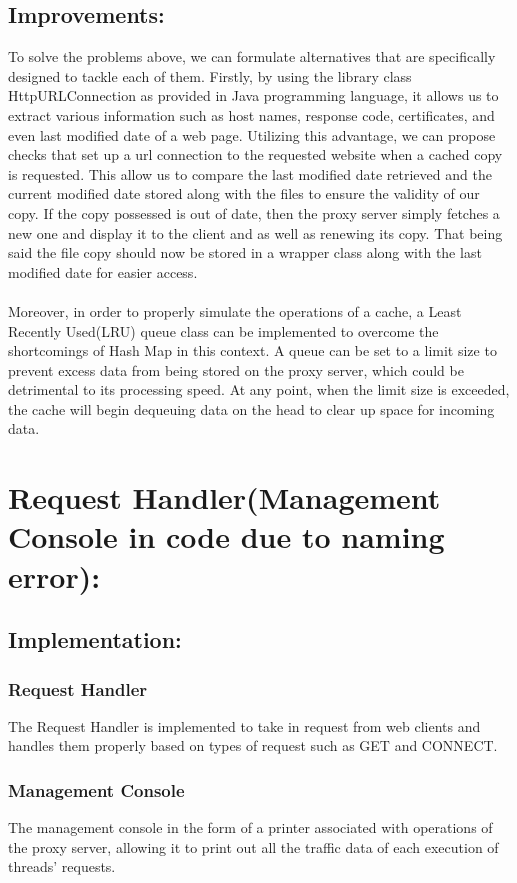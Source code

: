 \documentclass[12pt]{article}%
\begin{document}
\subsection*{Improvements:}
To solve the problems above, we can formulate alternatives that are specifically designed to tackle each of them. Firstly, by using the library class HttpURLConnection as provided in Java programming language, it allows us to extract various information such as host names, response code, certificates, and even last modified date of a web page. Utilizing this advantage, we can propose checks that set up a url connection to the requested website when a cached copy is requested. This allow us to compare the last modified date retrieved and the current modified date stored along with the files to ensure the validity of our copy. If the copy possessed is out of date, then the proxy server simply fetches a new one and display it to the client and as well as renewing its copy. That being said the file copy should now be stored in a wrapper class along with the last modified date for easier access. \\ \\
Moreover, in order to properly simulate the operations of a cache, a Least Recently Used(LRU) queue class can be implemented to overcome the shortcomings of Hash Map in this context. A queue can be set to a limit size to prevent excess data from being stored on the proxy server, which could be detrimental to its processing speed. At any point, when the limit size is exceeded, the cache will begin dequeuing data on the head to clear up space for incoming data.
\newpage
\section*{Request Handler(Management Console in code due to naming error): }
\subsection*{Implementation:}
\subsubsection*{Request Handler}
The Request Handler is implemented to take in request from web clients and handles them properly based on types of request such as GET and CONNECT. \\
\subsubsection*{Management Console}
The management console in the form of a printer associated with operations of the proxy server, allowing it to print out all the traffic data of each execution of threads' requests. 
\end{document}
